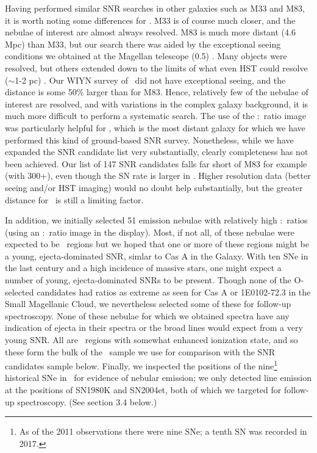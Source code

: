 Having performed similar SNR searches in other galaxies such as M33 and M83, it is worth noting some differences for \gal.  M33 is of course much closer, and the nebulae of interest are almost always resolved.  M83 is much more distant (4.6 Mpc) than M33, but our search there was aided by the exceptional seeing conditions we obtained at the Magellan telescope (0.5\arcsec) \citep{blair12}.  Many objects were resolved, but others extended down to the limits of what even HST could resolve ($\sim$1-2 pc) \citep{blair14}.  Our WIYN survey of \gal\ did not have exceptional seeing, and the distance is some 50\% larger than for M83.  Hence, relatively few of the nebulae of interest are resolved, and with variations in the complex galaxy background, it is much more difficult to perform a systematic search.  The use of the \sii:\ha\ ratio image was particularly helpful for \gal, which is the most distant galaxy for which we have performed this kind of ground-based SNR survey. Nonetheless, while we have expanded the SNR candidate list very substantially, clearly completeness has not been achieved.  Our list of 147 SNR candidates falls far short of M83 for example (with 300+), even though the SN rate is larger in \gal.  Higher resolution data (better seeing and/or HST imaging) would no doubt help substantially, but the greater distance for \gal\ is still a limiting factor.

In addition, we initially selected 51 emission nebulae with relatively high \oiii:\ha\ ratios (using an \oiii:\ha\ ratio image in the display).  Most, if not all, of these nebulae were expected to be \hii\ regions but we hoped that one or more of these regions might be a young, ejecta-dominated SNR, simlar to Cas A in the Galaxy. With ten SNe in the last century and a high incidence of massive stars, one might expect a number of young, ejecta-dominated SNRs to be present.  Though none of the O-selected candidates had ratios as extreme as seen for Cas A or 1E0102-72.3 in the Small Magellanic Cloud, we nevertheless selected some of these for follow-up spectroscopy.  None of these nebulae for which we obtained spectra have any indication of ejecta in their spectra or the broad lines would expect from a very young SNR.  All are \hii\ regions with somewhat enhanced ionization state, and so these form the bulk of the \hii\ sample we use for comparison with the SNR candidates sample below. Finally, we inspected the positions of the nine\footnote{As of the 2011 observations there were nine SNe; a tenth SN was recorded in 2017.} historical SNe in \gal\ for evidence of nebular emission; we only detected line emission at the positions of SN1980K and SN2004et, both of which we targeted for follow-up spectroscopy. (See section 3.4 below.)

